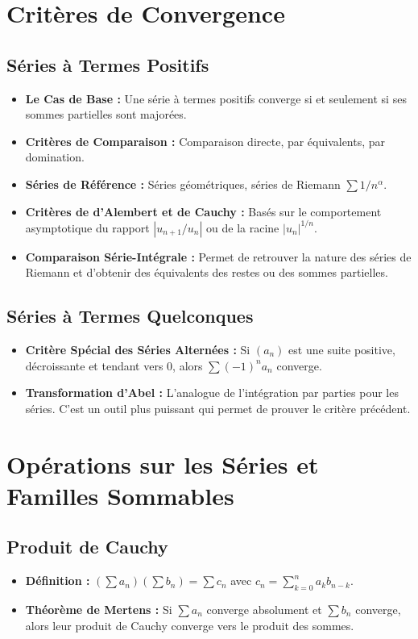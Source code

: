 \documentclass[12pt, a4paper, parskip=full]{report}
\theoremstyle{agregstyle}
\begin{document}
\section{Critères de Convergence}
\subsection{Séries à Termes Positifs}
\begin{itemize}
    \item \textbf{Le Cas de Base :} Une série à termes positifs converge si et seulement si ses sommes partielles sont majorées.
    \item \textbf{Critères de Comparaison :} Comparaison directe, par équivalents, par domination.
    \item \textbf{Séries de Référence :} Séries géométriques, séries de Riemann $\sum 1/n^\alpha$.
    \item \textbf{Critères de d'Alembert et de Cauchy :} Basés sur le comportement asymptotique du rapport $|u_{n+1}/u_n|$ ou de la racine $|u_n|^{1/n}$.
    \item \textbf{Comparaison Série-Intégrale :} Permet de retrouver la nature des séries de Riemann et d'obtenir des équivalents des restes ou des sommes partielles.
\end{itemize}
\subsection{Séries à Termes Quelconques}
\begin{itemize}
    \item \textbf{Critère Spécial des Séries Alternées :} Si $(a_n)$ est une suite positive, décroissante et tendant vers 0, alors $\sum (-1)^n a_n$ converge.
    \item \textbf{Transformation d'Abel :} L'analogue de l'intégration par parties pour les séries. C'est un outil plus puissant qui permet de prouver le critère précédent.
\end{itemize}

\section{Opérations sur les Séries et Familles Sommables}
\subsection{Produit de Cauchy}
\begin{itemize}
    \item \textbf{Définition :} $( \sum a_n ) ( \sum b_n ) = \sum c_n$ avec $c_n = \sum_{k=0}^n a_k b_{n-k}$.
    \item \textbf{Théorème de Mertens :} Si $\sum a_n$ converge absolument et $\sum b_n$ converge, alors leur produit de Cauchy converge vers le produit des sommes.
\end{itemize}
\end{document}
